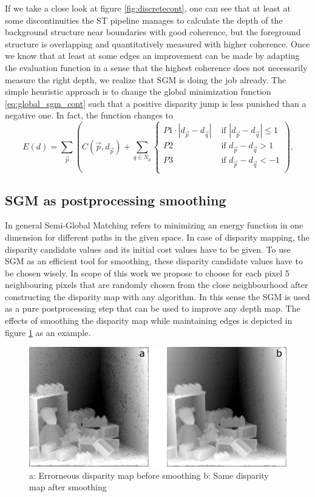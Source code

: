 \documentclass  [
  paper    = a4,
  BCOR     = 10mm,
  twoside,
  fontsize = 12pt,
  fleqn,
  toc      = bibnumbered,
  toc      = listofnumbered,
  numbers  = noendperiod,
  headings = normal,
  listof   = leveldown,
  version  = 3.03
]                                       {scrreprt}
\begin{document}
If we take a close look at figure \ref{fig:discretecont}, one can see that at least at some discontinuities the ST pipeline manages to calculate the depth of the background structure near boundaries with good coherence, but the foreground structure is overlapping and quantitatively measured with higher coherence. Once we know that at least at some edges an improvement can be made by adapting the evaluation function in a sense that the highest coherence does not necessarily measure the right depth, we realize that SGM is doing the job already. The simple heuristic approach is to change the global minimization function \ref{eq:global_sgm_cont} such that a positive disparity jump is less punished than a negative one. In fact, the function changes to
\begin{equation}\label{eq:global_sgm_cont_occlusion}
E(d) = \sum_{\vec p} \left(C(\vec{p}, d_{\vec p}) + \sum_{q\in N_p} 
\begin{cases}
P1\cdot |d_{\vec p} - d_{\vec q}|  & \text{ if }|d_{\vec p} - d_{\vec q}| \leq 1\\
P2 & \text{ if }d_{\vec p} - d_{\vec q} > 1\\
P3 & \text{ if }d_{\vec p} - d_{\vec q} < -1\\
\end{cases}  
\right).
\end{equation}
\subsection{SGM as postprocessing smoothing}
\label{sec:postprocessing_smoothing}
In general Semi-Global Matching refers to minimizing an energy function in one dimension for different paths in the given space. In case of disparity mapping, the disparity candidate values and its initial cost values have to be given. To use SGM as an efficient tool for smoothing, these disparity candidate values have to be chosen wisely. In scope of this work we propose to choose for each pixel 5 neighbouring pixels that are randomly chosen from the close neighbourhood after constructing the disparity map with any algorithm. In this sense the SGM is used as a pure postprocessing step that can be used to improve any depth map. The effects of smoothing the disparity map while maintaining edges is depicted in figure \ref{fig:sgmpprexample} as an example.
\begin{figure}
	\centering
	\includegraphics[width=1\linewidth]{images/sgm_ppr_example}
	\caption[Examplefor postprocessing smoothing]{a: Errorneous disparity map before smoothing b: Same disparity map after smoothing}
	\label{fig:sgmpprexample}
\end{figure}
\end{document}
